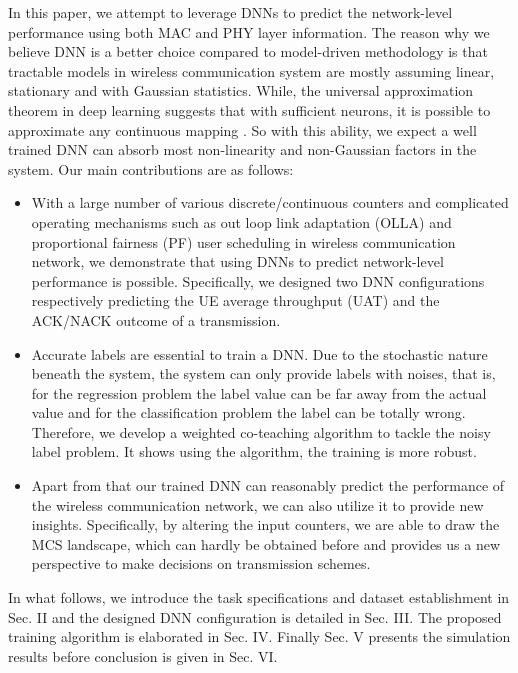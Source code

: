 \documentclass[conference,compsocconf]{IEEEtran}
\begin{document}
	In this paper, we attempt to leverage DNNs to predict the network-level performance using both MAC and PHY layer information. The reason why we believe DNN is a better choice compared to model-driven methodology is that tractable models in wireless communication system are mostly assuming linear, stationary and with Gaussian statistics. While, the universal approximation theorem in deep learning suggests that with sufficient neurons, it is possible to approximate any continuous mapping \cite{marsland2014machine}. So with this ability, we expect a well trained DNN can absorb most  non-linearity and non-Gaussian factors in the system. Our main contributions are as follows:
	\begin{itemize}
		\item With a large number of various discrete/continuous counters and complicated operating mechanisms such as out loop link adaptation (OLLA) and proportional fairness (PF) user scheduling in wireless communication network, we demonstrate that using DNNs to predict network-level performance is possible. Specifically, we designed two DNN configurations respectively predicting the UE average throughput (UAT) and the ACK/NACK outcome of a transmission.
		\item Accurate labels are essential to train a DNN. Due to the stochastic nature beneath the system, the system can only provide labels with noises, that is, for the regression problem the label value can be far away from the actual value and for the classification problem the label can be totally wrong. Therefore, we develop a weighted co-teaching algorithm to tackle the noisy label problem. It shows using the algorithm, the training is more robust.
		\item Apart from that our trained DNN can reasonably predict the performance of the wireless communication network, we can also utilize it to provide new insights. Specifically, by altering the input counters, we are able to draw the MCS landscape, which can hardly be obtained before and provides us a new perspective to make decisions on transmission schemes.
	\end{itemize}
	

	
	In what follows, we introduce the task specifications and dataset establishment in Sec. II and the designed DNN configuration is detailed in Sec. III. The proposed training algorithm is elaborated in Sec. IV. Finally Sec. V presents the simulation results before conclusion is given in Sec. VI.
		
\end{document}
